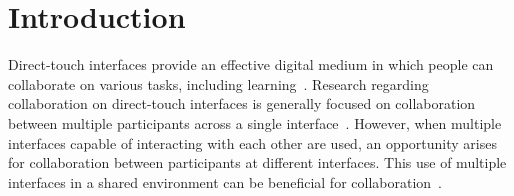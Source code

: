 \documentclass{bmcart}
\begin{document}
\begin{frontmatter}
\begin{abstractbox}

\begin{keyword}
\end{keyword}


\end{abstractbox}
%

\end{frontmatter}




\section*{Introduction}\label{sec:intro}

Direct-touch interfaces provide an effective digital medium in which people can collaborate on various tasks, including learning~\cite{Marshall2007a,Marshall2008}. 
Research regarding collaboration on direct-touch interfaces is generally focused on collaboration between multiple participants across a single interface~\cite{Piper2009,Rick2009,Ryall2006a}. 
However, when multiple interfaces capable of interacting with each other are used, an opportunity arises for collaboration between participants at different interfaces.
This use of multiple interfaces in a shared environment can be beneficial for collaboration~\cite{Wallace2008a,Wallace2009}.
\end{document}
